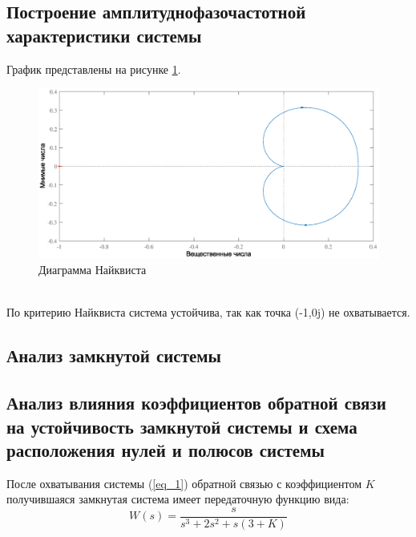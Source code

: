 \documentclass[a4paper,12pt]{article}
\begin{document}
	\subsection{Построение амплитуднофазочастотной характеристики системы}
	График представлены на рисунке \ref{s_3}.
	\begin{figure}[h!]
		\begin{center}
			\includegraphics[width=7in]{nyquist.eps}
			
		\end{center}
	\caption{Диаграмма Найквиста}
	\label{s_3}  
	\end{figure}
	\\
	По критерию	Найквиста система устойчива, так как точка (-1,0j) не охватывается.
	
		
	\newpage
	\begin{center}
		\section{Анализ замкнутой системы}
	\end{center}
	\subsection{Анализ влияния коэффициентов обратной связи на устойчивость замкнутой системы и схема расположения нулей и полюсов системы}
	После охватывания системы (\ref{eq_1}) обратной связью с коэффициентом $K$ получившаяся замкнутая система имеет передаточную функцию вида:\\
	
	\begin{equation}
	\displaystyle W(s)=\frac{s}{s^3+2s^2+s(3+K)}
	\label{eq_2}
	\end{equation}\\
	
\end{document}
